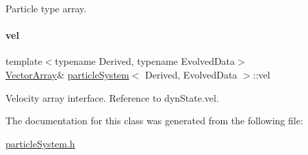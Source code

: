 Particle type array. 

\mbox{\label{classparticle_system_a545da170c4d59f18c6ddb18817cb5f3e}} 
\paragraph{\texorpdfstring{vel}{vel}}
{\footnotesize\ttfamily template$<$typename Derived, typename Evolved\+Data$>$ \\
\mbox{\hyperlink{classparticle_system_a6f66ed187a286c0d42ab2f83b8b6193b}{Vector\+Array}}\& \mbox{\hyperlink{classparticle_system}{particle\+System}}$<$ Derived, Evolved\+Data $>$\+::vel}



Velocity array interface. Reference to dyn\+State.\+vel. 



The documentation for this class was generated from the following file\+:\begin{DoxyCompactItemize}
\item 
\mbox{\hyperlink{particle_system_8h}{particle\+System.\+h}}\end{DoxyCompactItemize}
